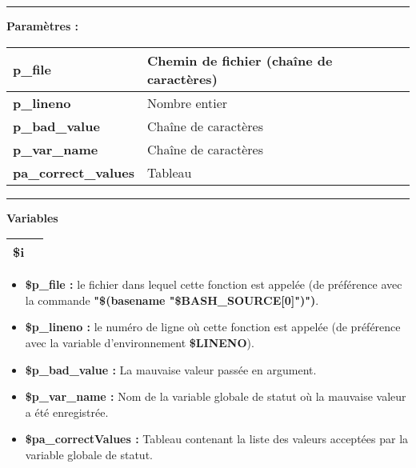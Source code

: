 \documentclass[a4paper,10pt]{article}
\begin{document}

\par\noindent\rule{\textwidth}{0.4pt}

\begin{justify}
    \textbf{Paramètres :}

    \begin{tabular}{|l|l|}
        \hline
        \textbf{\color{vars}p\_file} & Chemin de fichier (chaîne de caractères)\\
        \hline
        \textbf{\color{vars}p\_lineno} & Nombre entier\\
        \hline
        \textbf{\color{vars}p\_bad\_value} & Chaîne de caractères\\
        \hline
        \textbf{\color{vars}p\_var\_name} & Chaîne de caractères\\
        \hline
        \textbf{\color{vars}pa\_correct\_values} & Tableau\\
        \hline
    \end{tabular}
\end{justify}


\par\noindent\rule{\textwidth}{0.4pt}

\begin{justify}
    \textbf{Variables}

    \begin{tabular}{|l|l|}
        \hline
        \textbf{\color{vars}\$i} & \\
        \hline
    \end{tabular}
\end{justify}

\begin{justify}
    \begin{itemize}
        \item \textbf{\color{vars}\$p\_file\color{text} :} le fichier dans lequel cette fonction est appelée (de préférence avec la commande \textbf{\textbf{"\$(\color{cmds}basename \color{text}"\color{vars}\$BASH\_SOURCE[0]\color{text}")")}}.\setlength{\parskip}{1em}

        \item \textbf{\color{vars}\$p\_lineno\color{text} :} le numéro de ligne où cette fonction est appelée (de préférence avec la variable d'environnement \textbf{\color{vars}\$LINENO}).

        \item \textbf{\color{vars}\$p\_bad\_value\color{text} :} La mauvaise valeur passée en argument\color{text}.

        \item \textbf{\color{vars}\$p\_var\_name\color{text} :}  Nom de la variable globale de statut où la mauvaise valeur a été enregistrée.\color{text}

        \item \textbf{\color{vars}\$pa\_correctValues\color{text} :} Tableau contenant la liste des valeurs acceptées par la variable globale de statut.
    \end{itemize}
\end{justify}
\end{document}
